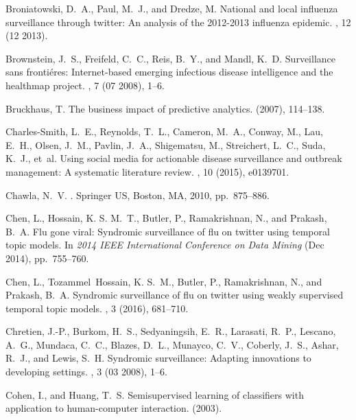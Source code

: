 \documentclass[10pt,letterpaper]{article}
\begin{document}
\begin{thebibliography}{10}
{\sc Broniatowski, D.~A., Paul, M.~J., and Dredze, M.}
\newblock National and local influenza surveillance through twitter: An
  analysis of the 2012-2013 influenza epidemic.
, 12 (12 2013).

{\sc Brownstein, J.~S., Freifeld, C.~C., Reis, B.~Y., and Mandl, K.~D.}
\newblock Surveillance sans fronti\'{e}res: Internet-based emerging infectious
  disease intelligence and the healthmap project.
, 7 (07 2008), 1--6.

{\sc Bruckhaus, T.}
\newblock The business impact of predictive analytics.
  (2007), 114--138.

{\sc Charles-Smith, L.~E., Reynolds, T.~L., Cameron, M.~A., Conway, M., Lau,
  E.~H., Olsen, J.~M., Pavlin, J.~A., Shigematsu, M., Streichert, L.~C., Suda,
  K.~J., et~al.}
\newblock Using social media for actionable disease surveillance and outbreak
  management: A systematic literature review.
, 10 (2015), e0139701.

{\sc Chawla, N.~V.}
.
\newblock Springer US, Boston, MA, 2010, pp.~875--886.

{\sc Chen, L., Hossain, K. S. M.~T., Butler, P., Ramakrishnan, N., and Prakash,
  B.~A.}
\newblock Flu gone viral: Syndromic surveillance of flu on twitter using
  temporal topic models.
\newblock In {\em 2014 IEEE International Conference on Data Mining\/} (Dec
  2014), pp.~755--760.

{\sc Chen, L., Tozammel~Hossain, K. S.~M., Butler, P., Ramakrishnan, N., and
  Prakash, B.~A.}
\newblock Syndromic surveillance of flu on twitter using weakly supervised
  temporal topic models.
, 3 (2016), 681--710.

{\sc Chretien, J.-P., Burkom, H.~S., Sedyaningsih, E.~R., Larasati, R.~P.,
  Lescano, A.~G., Mundaca, C.~C., Blazes, D.~L., Munayco, C.~V., Coberly,
  J.~S., Ashar, R.~J., and Lewis, S.~H.}
\newblock Syndromic surveillance: Adapting innovations to developing settings.
, 3 (03 2008), 1--6.

{\sc Cohen, I., and Huang, T.~S.}
\newblock Semisupervised learning of classifiers with application to
  human-computer interaction.
  (2003).


\end{thebibliography}
\end{document}
